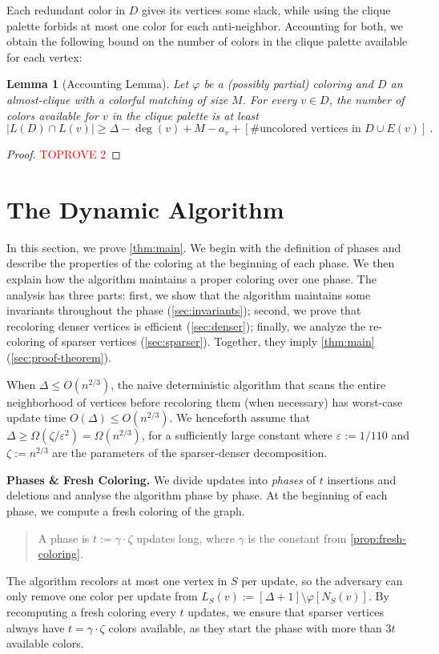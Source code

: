 \documentclass[a4paper,english,11pt]{amsart}
\renewcommand{\paragraph}[1]{\medskip\noindent\textbf{#1}}
\newtheorem{lemma}{Lemma}[section]
\theoremstyle{definition}
\renewcommand{\leq}{\leqslant}
\renewcommand{\geq}{\geqslant}
\newcommand{\eps}{\varepsilon}
\newcommand{\col}{\varphi}
\newcommand{\NS}{N_{S}}
\newcommand{\LS}{L_{S}}
\begin{document}
Each redundant color in $D$ gives its vertices some slack, while using the clique palette forbids at most one color for each anti-neighbor. Accounting for both, we obtain the following bound on the number of colors in the clique palette available for each vertex:
\begin{lemma}[Accounting Lemma]
    \label{prop:accounting}
    Let $\col$ be a (possibly partial) coloring and $D$ an almost-clique with a colorful matching of size $M$. For every $v\in D$,
    the number of colors available for $v$ in the clique palette is at least
    \[
        |L(D) \cap L(v)|
        \geq \Delta - \deg(v) + M - a_v + [\#\text{uncolored vertices in $D \cup E(v)$}] \ .
    \]
\end{lemma}

\begin{proof}\textcolor{red}{TOPROVE 2}\end{proof}
 \section{The Dynamic Algorithm}
\label{sec:dynamic}

In this section, we prove \cref{thm:main}. We begin with the definition of phases and describe the properties of the coloring at the beginning of each phase. We then explain how the algorithm maintains a proper coloring over one phase. The analysis has three parts: first, we show that the algorithm maintains some invariants 
throughout the phase
(\cref{sec:invariants}); second, we prove that recoloring denser vertices is efficient (\cref{sec:denser}); finally, we analyze the re-coloring of sparser vertices (\cref{sec:sparser}). Together, they imply \cref{thm:main} (\cref{sec:proof-theorem}).

When $\Delta \leq O(n^{2/3})$, the naive deterministic algorithm that scans the entire neighborhood of vertices before recoloring them (when necessary) has worst-case update time $O(\Delta) \leq O(n^{2/3})$. We henceforth assume that $\Delta \geq \Omega( \zeta/\eps^2 ) = \Omega(n^{2/3})$, for a sufficiently large constant where $\eps := 1/110$ and $\zeta := n^{2/3}$ are the parameters of the sparser-denser decomposition.


\paragraph{Phases \& Fresh Coloring.}
We divide updates into \emph{phases} of $t$ insertions and deletions and analyse the algorithm phase by phase.
At the beginning of each phase, we compute a fresh coloring of the graph.
\begin{quote}
    A phase is $t := \gamma \cdot \zeta$ updates long, where $\gamma$ is the constant from \cref{prop:fresh-coloring}.
\end{quote}
The algorithm recolors at most one vertex in $S$ per update, so the adversary can only remove one color per update from $\LS(v) := [\Delta+1] \setminus \col[\NS(v)]$.
By recomputing a fresh coloring every $t$ updates, we ensure that sparser vertices always have $t = \gamma \cdot \zeta$ colors available,  as they start the phase with more than $3t$ available colors.
\end{document}
